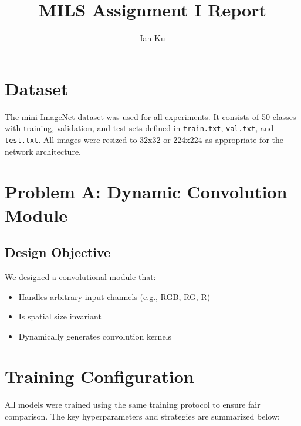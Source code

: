 \documentclass[12pt]{article}
\title{MILS Assignment I Report}
\author{Ian Ku}
\date{}
\begin{document}
\maketitle

\section*{Dataset}
The mini-ImageNet dataset was used for all experiments. It consists of 50 classes with training, validation, and test sets defined in \texttt{train.txt}, \texttt{val.txt}, and \texttt{test.txt}. All images were resized to 32x32 or 224x224 as appropriate for the network architecture.

\section*{Problem A: Dynamic Convolution Module}

\subsection*{Design Objective}
We designed a convolutional module that:
\begin{itemize}[noitemsep]
    \item Handles arbitrary input channels (e.g., RGB, RG, R)
    \item Is spatial size invariant
    \item Dynamically generates convolution kernels
\end{itemize}

\section*{Training Configuration}

All models were trained using the same training protocol to ensure fair comparison. The key hyperparameters and strategies are summarized below:
\end{document}
